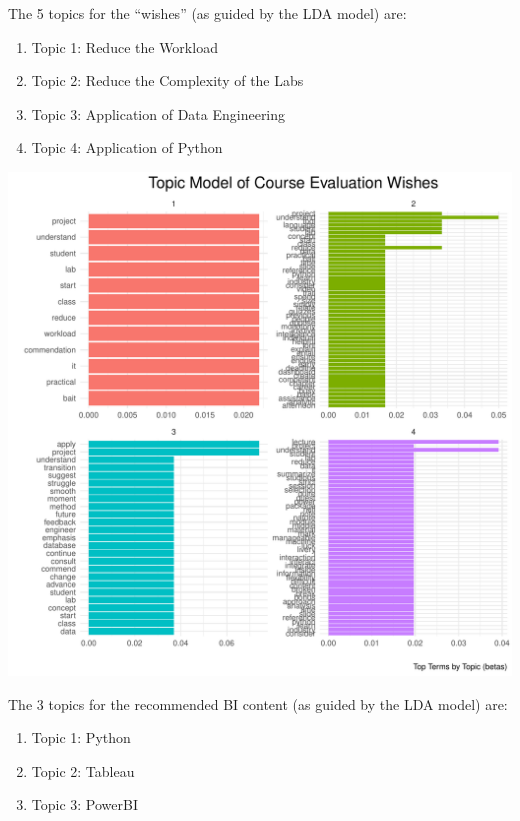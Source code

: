 \documentclass[
]{article}
\begin{document}
\newpage

The 5 topics for the ``wishes'' (as guided by the LDA model) are:

\begin{enumerate}
\def\labelenumi{\arabic{enumi}.}
\item
  Topic 1: Reduce the Workload
\item
  Topic 2: Reduce the Complexity of the Labs
\item
  Topic 3: Application of Data Engineering
\item
  Topic 4: Application of Python
\end{enumerate}

\includegraphics{10.b.BBT4206-End-SemesterCourseEvaluation-20230821-20231128-BI2-BBIT4-2_files/figure-latex/visualizations_for_wishes_topic_modelling-1.pdf}

\newpage

The 3 topics for the recommended BI content (as guided by the LDA model)
are:

\begin{enumerate}
\def\labelenumi{\arabic{enumi}.}
\item
  Topic 1: Python
\item
  Topic 2: Tableau
\item
  Topic 3: PowerBI
\end{enumerate}
\end{document}
